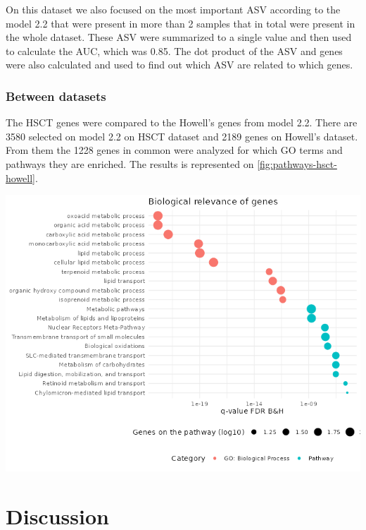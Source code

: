 \documentclass[
  a4paper,
]{book}
\let\origfigure\figure
\let\endorigfigure\endfigure
\renewenvironment{figure}[1][2] {
    \expandafter\origfigure\expandafter[!ht]
} {
    \endorigfigure
}
\begin{document}
On this dataset we also focused on the most important ASV according to the model 2.2 that were present in more than 2 samples that in total were present in the whole dataset.
These ASV were summarized to a single value and then used to calculate the AUC, which was 0.85.
The dot product of the ASV and genes were also calculated and used to find out which ASV are related to which genes.

\hypertarget{between-datasets}{%
\subsection{Between datasets}\label{between-datasets}}

The HSCT genes were compared to the Howell's genes from model 2.2.
There are 3580 selected on model 2.2 on HSCT dataset and 2189 genes on Howell's dataset.
From them the 1228 genes in common were analyzed for which GO terms and pathways they are enriched.
The results is represented on \ref{fig:pathways-hsct-howell}.

\begin{figure}
\includegraphics[width=1\linewidth]{images/pathways_hsct_howell} \caption[Significance of pathways on common genes on HSCT and Howell's dataset.]{Significance of pathways on common genes on HSCT and Howell's dataset ordered by p-value, the size is according to the number of genes on the pathway found on the dataset.}\label{fig:pathways-hsct-howell}
\end{figure}

\hypertarget{discussion}{%
\chapter{Discussion}\label{discussion}}
\end{document}
